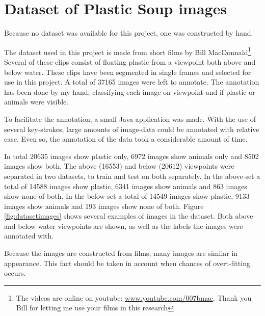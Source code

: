 \section{Dataset of Plastic Soup images}
\label{sec:Method-Data}
Because no dataset was available for this project, one was constructed by hand.


The dataset used in this project is made from short films by Bill MacDonnald\footnote{The videos are online on youtube: \url{www.youtube.com/007bmac}. Thank you Bill for letting me use your films in this research}.
Several of these clips consist of floating plastic from a viewpoint both above and below water.
These clips have been segmented in single frames and selected for use in this project.
A total of 37165 images were left to annotate.
The annotation has been done by my hand, classifying each image on viewpoint and if plastic or animals were visible.

To facilitate the annotation, a small Java-application was made.
With the use of several key-strokes, large amounts of image-data could be annotated with relative ease.
Even so, the annotation of the data took a considerable amount of time.

In total 20635 images show plastic only, 6972 images show animals only and 8502 images show both.
The above (16553) and below (20612) viewpoints were separated in two datasets, to train and test on both separately. 
In the above-set a total of 14588 images show plastic, 6341 images show animals and 863 images show none of both. In the below-set a total of 14549 images show plastic, 9133 images show animals and 193 images show none of both.
Figure \ref{fig:datasetimages} shows several examples of images in the dataset.
Both above and below water viewpoints are shown, as well as the labels the images were annotated with.

Because the images are constructed from films, many images are similar in appearance.
This fact should be taken in account when chances of overt-fitting occurs.


